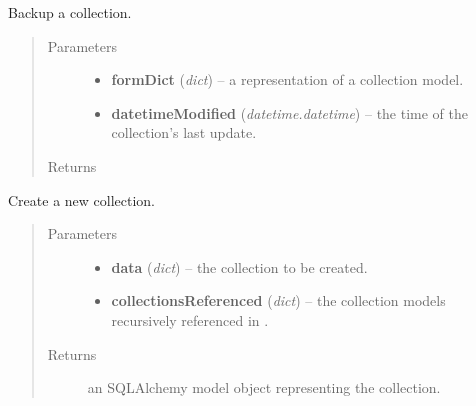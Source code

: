 \documentclass[letterpaper,10pt,english]{sphinxmanual}
\begin{document}

\begin{fulllineitems}
\label{api:onlinelinguisticdatabase.controllers.oldcollections.backupCollection}
Backup a collection.
\begin{quote}\begin{description}
\item[{Parameters}] \leavevmode\begin{itemize}
\item {} 
\textbf{formDict} (\emph{dict}) -- a representation of a collection model.

\item {} 
\textbf{datetimeModified} (\emph{datetime.datetime}) -- the time of the collection's
last update.

\end{itemize}

\item[{Returns}] \leavevmode
{}

\end{description}\end{quote}

\end{fulllineitems}


\begin{fulllineitems}
\label{api:onlinelinguisticdatabase.controllers.oldcollections.createNewCollection}
Create a new collection.
\begin{quote}\begin{description}
\item[{Parameters}] \leavevmode\begin{itemize}
\item {} 
\textbf{data} (\emph{dict}) -- the collection to be created.

\item {} 
\textbf{collectionsReferenced} (\emph{dict}) -- the collection models recursively referenced in .

\end{itemize}

\item[{Returns}] \leavevmode
an SQLAlchemy model object representing the collection.

\end{description}\end{quote}

\end{fulllineitems}
\end{document}
